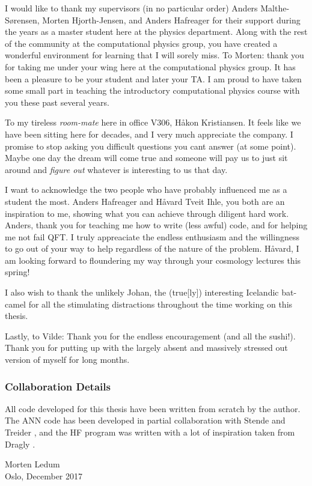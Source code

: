 \documentclass[twoside,english]{uiofysmaster}
\begin{document}
\begin{acknowledgements}
  I would like to thank my supervisors (in no particular order) Anders Malthe-Sørensen, Morten Hjorth-Jensen, and Anders Hafreager for their support during the years as a master student here at the physics department. Along with the rest of the community at the computational physics group, you have created a wonderful environment for learning that I will sorely miss. To Morten: thank you for taking me under your wing here at the computational physics group. It has been a pleasure to be your student and later your TA. I am proud to have taken some small part in teaching the introductory computational physics course with you these past several years. 

  To my tireless \emph{room-mate} here in office V306, Håkon Kristiansen. It feels like we have been sitting here for decades, and I very much appreciate the company. I promise to stop asking you difficult questions you cant answer (at some point). Maybe one day the dream will come true and someone will pay us to just sit around and \emph{figure out} whatever is interesting to us that day.

  I want to acknowledge the two people who have probably influenced me as a student the most. Anders Hafreager and Håvard Tveit Ihle, you both are an inspiration to me, showing what you can achieve through diligent hard work. Anders, thank you for teaching me how to write (less awful) code, and for helping me not fail QFT. I truly appreaciate the endless enthusiasm and the willingness to go out of your way to help regardless of the nature of the problem. Håvard, I am looking forward to floundering my way through your cosmology lectures this spring!

  I also wish to thank the unlikely Johan, the (true[ly]) interesting Icelandic bat-camel for all the stimulating distractions throughout the time working on this thesis.

  Lastly, to Vilde: Thank you for the endless encouragement (and all the sushi!). Thank you for putting up with the largely absent and massively stressed out version of myself for long months.

  \subsubsection*{Collaboration Details}
  All code developed for this thesis have been written from scratch by the author. The ANN code has been developed in partial collaboration with Stende \cite{stende} and Treider \cite{treider}, and the HF program was written with a lot of inspiration taken from Dragly \cite{dragly}.

  \begin{flushright}
  Morten Ledum \\ Oslo, December 2017
  \end{flushright}

\end{acknowledgements}
\end{document}
